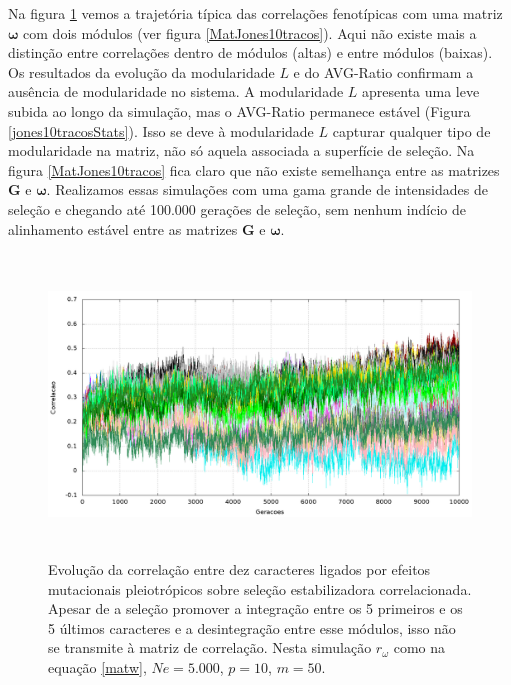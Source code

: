 Na figura \ref{jones10tracos} vemos a trajetória típica das correlações
fenotípicas com uma matriz $\pmb{\omega}$ com dois módulos (ver figura
\ref{MatJones10tracos}).  
Aqui não existe mais a distinção entre
correlações dentro de módulos (altas) e entre módulos (baixas). 
Os resultados da evolução da modularidade $L$ e do AVG-Ratio confirmam a
ausência de modularidade no sistema. 
A modularidade $L$ apresenta uma leve subida ao longo da simulação, mas
o AVG-Ratio permanece estável (Figura \ref{jones10tracosStats}). 
Isso se deve à modularidade $L$ capturar qualquer tipo de modularidade
na matriz, não só aquela associada a superfície de seleção. 
Na figura \ref{MatJones10tracos} fica claro que não existe semelhança
entre as matrizes $\mathbf{G}$ e $\pmb{\omega}$. 
Realizamos essas simulações com uma gama grande de intensidades de
seleção e chegando até 100.000 gerações de seleção, sem nenhum indício de
alinhamento estável entre as matrizes $\mathbf{G}$ e $\pmb{\omega}$.  


\begin{figure}[htbp]
    \centering
    \includegraphics[width=150mm, height=80mm]{figuras/jones10tracos.png}
    \caption{Evolução da correlação entre dez caracteres ligados por efeitos
        mutacionais pleiotrópicos sobre seleção estabilizadora
        correlacionada. Apesar de a seleção promover a integração entre os
        5 primeiros e os 5 últimos caracteres e a desintegração entre esse
        módulos, isso não se transmite à matriz de correlação. Nesta simulação
        $r_\omega$ como na equação \ref{matw}, $Ne=5.000$, $p=10$, $m=50$.}
    \label{jones10tracos}
\end{figure}



